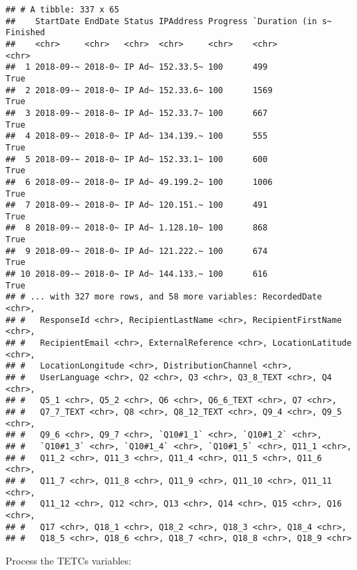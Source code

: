 \documentclass[]{article}
\begin{document}
\begin{verbatim}
## # A tibble: 337 x 65
##    StartDate EndDate Status IPAddress Progress `Duration (in s~ Finished
##    <chr>     <chr>   <chr>  <chr>     <chr>    <chr>            <chr>   
##  1 2018-09-~ 2018-0~ IP Ad~ 152.33.5~ 100      499              True    
##  2 2018-09-~ 2018-0~ IP Ad~ 152.33.6~ 100      1569             True    
##  3 2018-09-~ 2018-0~ IP Ad~ 152.33.7~ 100      667              True    
##  4 2018-09-~ 2018-0~ IP Ad~ 134.139.~ 100      555              True    
##  5 2018-09-~ 2018-0~ IP Ad~ 152.33.1~ 100      600              True    
##  6 2018-09-~ 2018-0~ IP Ad~ 49.199.2~ 100      1006             True    
##  7 2018-09-~ 2018-0~ IP Ad~ 120.151.~ 100      491              True    
##  8 2018-09-~ 2018-0~ IP Ad~ 1.128.10~ 100      868              True    
##  9 2018-09-~ 2018-0~ IP Ad~ 121.222.~ 100      674              True    
## 10 2018-09-~ 2018-0~ IP Ad~ 144.133.~ 100      616              True    
## # ... with 327 more rows, and 58 more variables: RecordedDate <chr>,
## #   ResponseId <chr>, RecipientLastName <chr>, RecipientFirstName <chr>,
## #   RecipientEmail <chr>, ExternalReference <chr>, LocationLatitude <chr>,
## #   LocationLongitude <chr>, DistributionChannel <chr>,
## #   UserLanguage <chr>, Q2 <chr>, Q3 <chr>, Q3_8_TEXT <chr>, Q4 <chr>,
## #   Q5_1 <chr>, Q5_2 <chr>, Q6 <chr>, Q6_6_TEXT <chr>, Q7 <chr>,
## #   Q7_7_TEXT <chr>, Q8 <chr>, Q8_12_TEXT <chr>, Q9_4 <chr>, Q9_5 <chr>,
## #   Q9_6 <chr>, Q9_7 <chr>, `Q10#1_1` <chr>, `Q10#1_2` <chr>,
## #   `Q10#1_3` <chr>, `Q10#1_4` <chr>, `Q10#1_5` <chr>, Q11_1 <chr>,
## #   Q11_2 <chr>, Q11_3 <chr>, Q11_4 <chr>, Q11_5 <chr>, Q11_6 <chr>,
## #   Q11_7 <chr>, Q11_8 <chr>, Q11_9 <chr>, Q11_10 <chr>, Q11_11 <chr>,
## #   Q11_12 <chr>, Q12 <chr>, Q13 <chr>, Q14 <chr>, Q15 <chr>, Q16 <chr>,
## #   Q17 <chr>, Q18_1 <chr>, Q18_2 <chr>, Q18_3 <chr>, Q18_4 <chr>,
## #   Q18_5 <chr>, Q18_6 <chr>, Q18_7 <chr>, Q18_8 <chr>, Q18_9 <chr>
\end{verbatim}

Process the TETCs variables:
\end{document}
